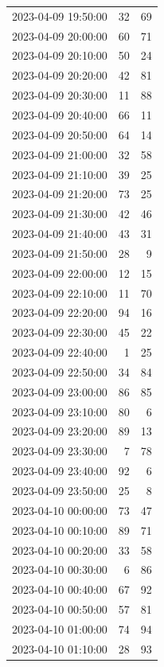 \documentclass[
  letterpaper,
  DIV=11,
  numbers=noendperiod]{scrartcl}
\begin{document}
\begin{tabular}{lrr}
2023-04-09 19:50:00 &    32 &    69 \\
2023-04-09 20:00:00 &    60 &    71 \\
2023-04-09 20:10:00 &    50 &    24 \\
2023-04-09 20:20:00 &    42 &    81 \\
2023-04-09 20:30:00 &    11 &    88 \\
2023-04-09 20:40:00 &    66 &    11 \\
2023-04-09 20:50:00 &    64 &    14 \\
2023-04-09 21:00:00 &    32 &    58 \\
2023-04-09 21:10:00 &    39 &    25 \\
2023-04-09 21:20:00 &    73 &    25 \\
2023-04-09 21:30:00 &    42 &    46 \\
2023-04-09 21:40:00 &    43 &    31 \\
2023-04-09 21:50:00 &    28 &     9 \\
2023-04-09 22:00:00 &    12 &    15 \\
2023-04-09 22:10:00 &    11 &    70 \\
2023-04-09 22:20:00 &    94 &    16 \\
2023-04-09 22:30:00 &    45 &    22 \\
2023-04-09 22:40:00 &     1 &    25 \\
2023-04-09 22:50:00 &    34 &    84 \\
2023-04-09 23:00:00 &    86 &    85 \\
2023-04-09 23:10:00 &    80 &     6 \\
2023-04-09 23:20:00 &    89 &    13 \\
2023-04-09 23:30:00 &     7 &    78 \\
2023-04-09 23:40:00 &    92 &     6 \\
2023-04-09 23:50:00 &    25 &     8 \\
2023-04-10 00:00:00 &    73 &    47 \\
2023-04-10 00:10:00 &    89 &    71 \\
2023-04-10 00:20:00 &    33 &    58 \\
2023-04-10 00:30:00 &     6 &    86 \\
2023-04-10 00:40:00 &    67 &    92 \\
2023-04-10 00:50:00 &    57 &    81 \\
2023-04-10 01:00:00 &    74 &    94 \\
2023-04-10 01:10:00 &    28 &    93 \\

\end{tabular}
\end{document}
